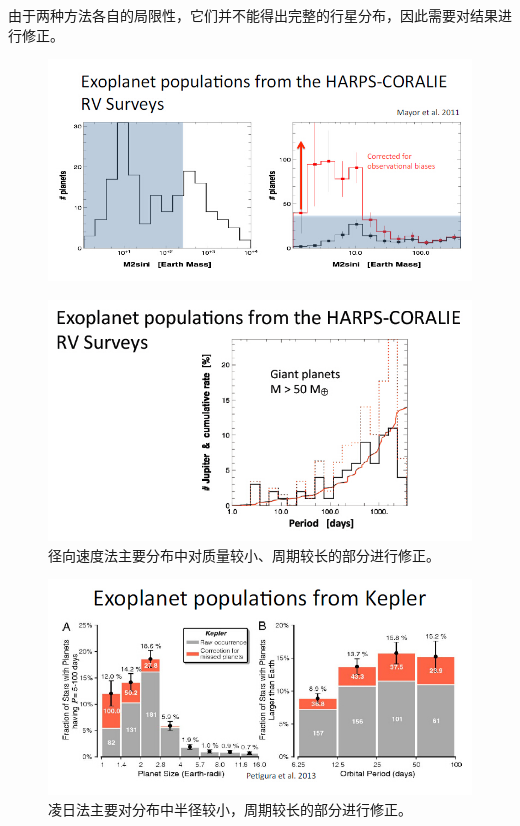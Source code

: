 \documentclass[letterpaper,10pt,english]{sphinxmanual}
\begin{document}
由于两种方法各自的局限性，它们并不能得出完整的行星分布，因此需要对结果进行修正。
\begin{figure}[htbp]
\centering

\includegraphics{Correction1.jpg}
\end{figure}
\begin{figure}[htbp]
\centering
\capstart

\includegraphics{Correction2.jpg}
\caption{径向速度法主要分布中对质量较小、周期较长的部分进行修正。}\end{figure}
\begin{figure}[htbp]
\centering
\capstart

\includegraphics{Correction3.jpg}
\caption{凌日法主要对分布中半径较小，周期较长的部分进行修正。}\end{figure}
\end{document}
